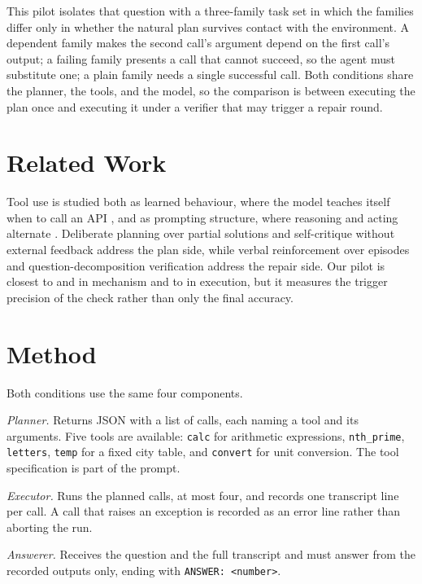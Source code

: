 \documentclass[runningheads,a4paper]{llncs}
\begin{document}
This pilot isolates that question with a three-family task set in which the families differ only in whether the natural plan survives contact with the environment. A dependent family makes the second call's argument depend on the first call's output; a failing family presents a call that cannot succeed, so the agent must substitute one; a plain family needs a single successful call. Both conditions share the planner, the tools, and the model, so the comparison is between executing the plan once and executing it under a verifier that may trigger a repair round.

\section{Related Work}

Tool use is studied both as learned behaviour, where the model teaches itself when to call an API \cite{interop2025}, and as prompting structure, where reasoning and acting alternate \cite{camel2025}. Deliberate planning over partial solutions \cite{struq2024} and self-critique without external feedback \cite{acps2026repo} address the plan side, while verbal reinforcement over episodes \cite{conformal2021} and question-decomposition verification \cite{debenedetti2024agentdojo} address the repair side. Our pilot is closest to \cite{conformal2021} and \cite{debenedetti2024agentdojo} in mechanism and to \cite{camel2025} in execution, but it measures the trigger precision of the check rather than only the final accuracy.

\section{Method}

Both conditions use the same four components.

\emph{Planner.} Returns JSON with a list of calls, each naming a tool and its arguments. Five tools are available: \texttt{calc} for arithmetic expressions, \texttt{nth\_\allowbreak{}prime}, \texttt{letters}, \texttt{temp} for a fixed city table, and \texttt{convert} for unit conversion. The tool specification is part of the prompt.

\emph{Executor.} Runs the planned calls, at most four, and records one transcript line per call. A call that raises an exception is recorded as an error line rather than aborting the run.

\emph{Answerer.} Receives the question and the full transcript and must answer from the recorded outputs only, ending with \texttt{ANSWER: <number>}.
\end{document}
